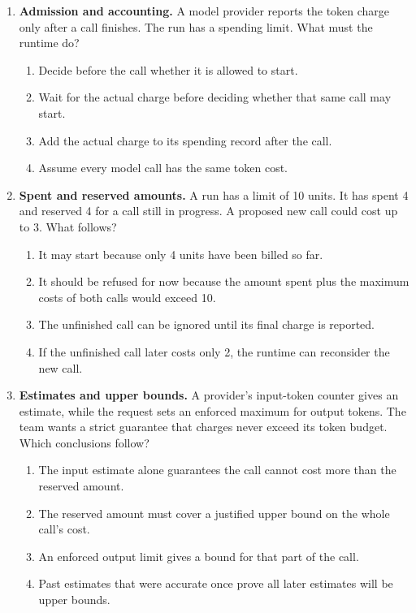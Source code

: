 \begin{enumerate}[start=51,itemsep=0.7\baselineskip]
\item\label{exercise:51} \begin{minipage}[t]{\linewidth}
\textbf{Admission and accounting.} A model provider reports the token charge only after a call finishes. The run has a spending limit. What must the runtime do?
\begin{enumerate}[label=\textnormal{(\Alph*)},leftmargin=*,itemsep=0pt]
\item Decide before the call whether it is allowed to start.
\item Wait for the actual charge before deciding whether that same call may start.
\item Add the actual charge to its spending record after the call.
\item Assume every model call has the same token cost.
\end{enumerate}
\end{minipage}

\item\label{exercise:52} \begin{minipage}[t]{\linewidth}
\textbf{Spent and reserved amounts.} A run has a limit of 10 units. It has spent 4 and reserved 4 for a call still in progress. A proposed new call could cost up to 3. What follows?
\begin{enumerate}[label=\textnormal{(\Alph*)},leftmargin=*,itemsep=0pt]
\item It may start because only 4 units have been billed so far.
\item It should be refused for now because the amount spent plus the maximum costs of both calls would exceed 10.
\item The unfinished call can be ignored until its final charge is reported.
\item If the unfinished call later costs only 2, the runtime can reconsider the new call.
\end{enumerate}
\end{minipage}

\item\label{exercise:53} \begin{minipage}[t]{\linewidth}
\textbf{Estimates and upper bounds.} A provider's input-token counter gives an estimate, while the request sets an enforced maximum for output tokens. The team wants a strict guarantee that charges never exceed its token budget. Which conclusions follow?
\begin{enumerate}[label=\textnormal{(\Alph*)},leftmargin=*,itemsep=0pt]
\item The input estimate alone guarantees the call cannot cost more than the reserved amount.
\item The reserved amount must cover a justified upper bound on the whole call's cost.
\item An enforced output limit gives a bound for that part of the call.
\item Past estimates that were accurate once prove all later estimates will be upper bounds.
\end{enumerate}
\end{minipage}


\end{enumerate}

